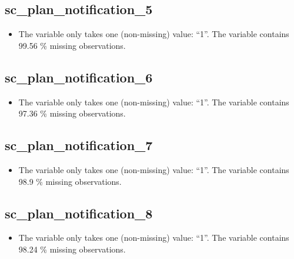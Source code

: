 \documentclass[
  letterpaper,
  DIV=11,
  numbers=noendperiod]{scrartcl}
\providecommand{\tightlist}{%
  \setlength{\itemsep}{0pt}\setlength{\parskip}{0pt}}
\begin{document}
\fullline

\subsection{sc\_plan\_notification\_5}\label{sc_plan_notification_5}

\begin{itemize}
\tightlist
\item
  The variable only takes one (non-missing) value: ``1''. The variable
  contains 99.56 \% missing observations.
\end{itemize}

\fullline

\subsection{sc\_plan\_notification\_6}\label{sc_plan_notification_6}

\begin{itemize}
\tightlist
\item
  The variable only takes one (non-missing) value: ``1''. The variable
  contains 97.36 \% missing observations.
\end{itemize}

\fullline

\subsection{sc\_plan\_notification\_7}\label{sc_plan_notification_7}

\begin{itemize}
\tightlist
\item
  The variable only takes one (non-missing) value: ``1''. The variable
  contains 98.9 \% missing observations.
\end{itemize}

\fullline

\subsection{sc\_plan\_notification\_8}\label{sc_plan_notification_8}

\begin{itemize}
\tightlist
\item
  The variable only takes one (non-missing) value: ``1''. The variable
  contains 98.24 \% missing observations.
\end{itemize}

\fullline
\end{document}
